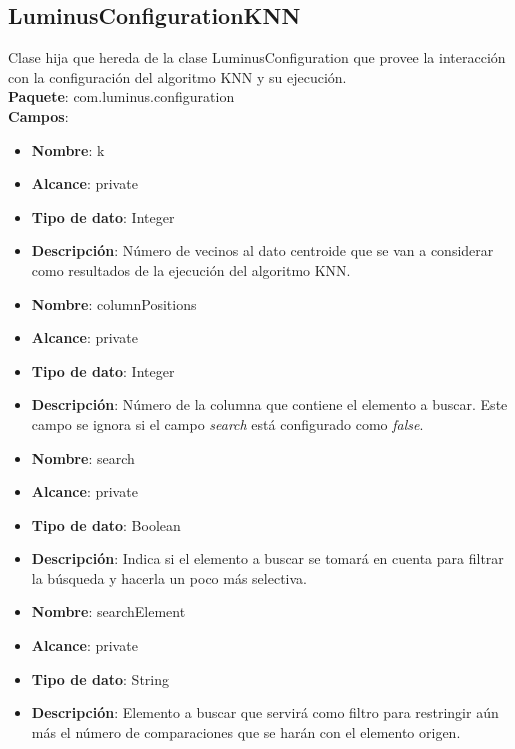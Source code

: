 \subsection{LuminusConfigurationKNN}
Clase hija que hereda de la clase LuminusConfiguration que provee la interacción con la configuración del algoritmo KNN y su ejecución.\\
\textbf{Paquete}: com.luminus.configuration\\
\textbf{Campos}:
\begin{UClist}
	\begin{itemize}
		\item \textbf{Nombre}: k
		\item \textbf{Alcance}: private
		\item \textbf{Tipo de dato}: Integer
		\item \textbf{Descripción}: Número de vecinos al dato centroide que se van a considerar como resultados de la ejecución del algoritmo KNN.\\
	\end{itemize}
	\begin{itemize}
		\item \textbf{Nombre}: columnPositions
		\item \textbf{Alcance}: private
		\item \textbf{Tipo de dato}: Integer
		\item \textbf{Descripción}: Número de la columna que contiene el elemento a buscar. Este campo se ignora si el campo \emph{search} está configurado como \emph{false}.\\
	\end{itemize}
	\begin{itemize}
		\item \textbf{Nombre}: search
		\item \textbf{Alcance}: private
		\item \textbf{Tipo de dato}: Boolean
		\item \textbf{Descripción}: Indica si el elemento a buscar se tomará en cuenta para filtrar la búsqueda y hacerla un poco más selectiva.\\
	\end{itemize}
	\begin{itemize}
		\item \textbf{Nombre}: searchElement
		\item \textbf{Alcance}: private
		\item \textbf{Tipo de dato}: String
		\item \textbf{Descripción}: Elemento a buscar que servirá como filtro para restringir aún más el número de comparaciones que se harán con el elemento origen.\\

\end{itemize}
\end{UClist}

